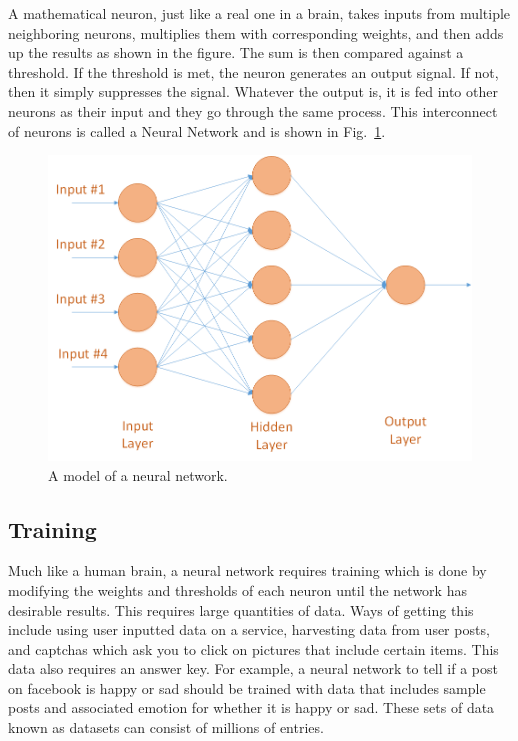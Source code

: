 \documentclass[12pt]{article}
\begin{document}
    A mathematical neuron, just like a real one in a brain, takes inputs from multiple neighboring neurons, multiplies them with corresponding weights, and then adds up the results as shown in the figure. The sum is then compared against a threshold. If the threshold is met, the neuron generates an output signal. If not, then it simply suppresses the signal. Whatever the output is, it is fed into other neurons as their input and they go through the same process. This interconnect of neurons is called a Neural Network and is shown in Fig.~\ref{fig:NN}.

    
    \begin{figure}
        \begin{center}
            \includegraphics[width=5in]{Neural_Network.png}
        \end{center}
        \caption{A model of a neural network.}
        \label{fig:NN}
    \end{figure}
    
    \subsection{Training}
    Much like a human brain, a neural network requires training which is done by modifying the weights and thresholds of each neuron until the network has desirable results. This requires large quantities of data. Ways of getting this include using user inputted data on a service, harvesting data from user posts, and captchas which ask you to click on pictures that include certain items. This data also requires an answer key. For example, a neural network to tell if a post on facebook is happy or sad should be trained with data that includes sample posts and associated emotion for whether it is happy or sad. These sets of data known as datasets can consist of millions of entries.
\end{document}
